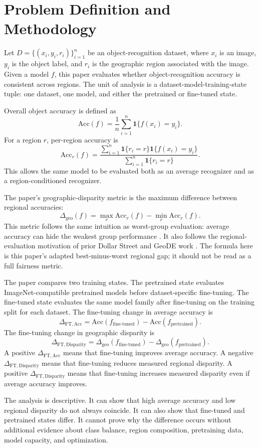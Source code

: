 \section{Problem Definition and Methodology}

Let \(D=\{(x_i,y_i,r_i)\}_{i=1}^{n}\) be an object-recognition dataset, where \(x_i\) is an image, \(y_i\) is the object label, and \(r_i\) is the geographic region associated with the image. Given a model \(f\), this paper evaluates whether object-recognition accuracy is consistent across regions. The unit of analysis is a dataset-model-training-state tuple: one dataset, one model, and either the pretrained or fine-tuned state.

Overall object accuracy is defined as
\[
    \mathrm{Acc}(f)
    =
    \frac{1}{n}\sum_{i=1}^{n}\mathbf{1}\{f(x_i)=y_i\}.
\]
For a region \(r\), per-region accuracy is
\[
    \mathrm{Acc}_{r}(f)
    =
    \frac{\sum_{i=1}^{n}\mathbf{1}\{r_i=r\}\mathbf{1}\{f(x_i)=y_i\}}
    {\sum_{i=1}^{n}\mathbf{1}\{r_i=r\}}.
\]
This allows the same model to be evaluated both as an average recognizer and as a region-conditioned recognizer.

The paper's geographic-disparity metric is the maximum difference between regional accuracies:
\[
    \Delta_{\mathrm{geo}}(f)
    =
    \max_{r}\mathrm{Acc}_{r}(f)
    -
    \min_{r}\mathrm{Acc}_{r}(f).
\]
This metric follows the same intuition as worst-group evaluation: average accuracy can hide the weakest group performance \citep{sagawa2020groupdro}. It also follows the regional-evaluation motivation of prior Dollar Street and GeoDE work \citep{devries2019object,ramaswamy2023geode}. The formula here is this paper's adapted best-minus-worst regional gap; it should not be read as a full fairness metric.

The paper compares two training states. The pretrained state evaluates ImageNet-compatible pretrained models before dataset-specific fine-tuning. The fine-tuned state evaluates the same model family after fine-tuning on the training split for each dataset. The fine-tuning change in average accuracy is
\[
    \Delta_{\mathrm{FT,Acc}}
    =
    \mathrm{Acc}(f_{\mathrm{fine\text{-}tuned}})
    -
    \mathrm{Acc}(f_{\mathrm{pretrained}}).
\]
The fine-tuning change in geographic disparity is
\[
    \Delta_{\mathrm{FT,Disparity}}
    =
    \Delta_{\mathrm{geo}}(f_{\mathrm{fine\text{-}tuned}})
    -
    \Delta_{\mathrm{geo}}(f_{\mathrm{pretrained}}).
\]
A positive \(\Delta_{\mathrm{FT,Acc}}\) means that fine-tuning improves average accuracy. A negative \(\Delta_{\mathrm{FT,Disparity}}\) means that fine-tuning reduces measured regional disparity. A positive \(\Delta_{\mathrm{FT,Disparity}}\) means that fine-tuning increases measured disparity even if average accuracy improves.

The analysis is descriptive. It can show that high average accuracy and low regional disparity do not always coincide. It can also show that fine-tuned and pretrained states differ. It cannot prove why the difference occurs without additional evidence about class balance, region composition, pretraining data, model capacity, and optimization.
